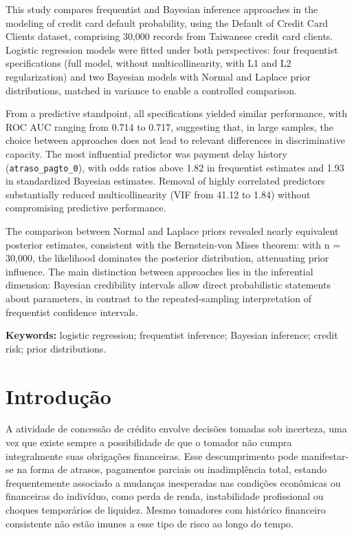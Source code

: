 \documentclass[
  brazilian,
  12pt,
  letterpaper,
  DIV=11,
  numbers=noendperiod]{scrartcl}
\begin{document}
This study compares frequentist and Bayesian inference approaches in the modeling of credit card default probability, using the Default of Credit Card Clients dataset, comprising 30,000 records from Taiwanese credit card clients. Logistic regression models were fitted under both perspectives: four frequentist specifications (full model, without multicollinearity, with L1 and L2 regularization) and two Bayesian models with Normal and Laplace prior distributions, matched in variance to enable a controlled comparison.

From a predictive standpoint, all specifications yielded similar performance, with ROC AUC ranging from 0.714 to 0.717, suggesting that, in large samples, the choice between approaches does not lead to relevant differences in discriminative capacity. The most influential predictor was payment delay history (\texttt{atraso\_pagto\_0}), with odds ratios above 1.82 in frequentist estimates and 1.93 in standardized Bayesian estimates. Removal of highly correlated predictors substantially reduced multicollinearity (VIF from 41.12 to 1.84) without compromising predictive performance.

The comparison between Normal and Laplace priors revealed nearly equivalent posterior estimates, consistent with the Bernstein-von Mises theorem: with n = 30,000, the likelihood dominates the posterior distribution, attenuating prior influence. The main distinction between approaches lies in the inferential dimension: Bayesian credibility intervals allow direct probabilistic statements about parameters, in contrast to the repeated-sampling interpretation of frequentist confidence intervals.


\vspace{1cm}

\noindent\textbf{Keywords:} logistic regression; frequentist inference; Bayesian inference; credit risk; prior distributions.
\newpage

\tableofcontents
\newpage

\section{Introdução}\label{introduuxe7uxe3o}

A atividade de concessão de crédito envolve decisões tomadas sob
incerteza, uma vez que existe sempre a possibilidade de que o tomador
não cumpra integralmente suas obrigações financeiras. Esse
descumprimento pode manifestar-se na forma de atrasos, pagamentos
parciais ou inadimplência total, estando frequentemente associado a
mudanças inesperadas nas condições econômicas ou financeiras do
indivíduo, como perda de renda, instabilidade profissional ou choques
temporários de liquidez. Mesmo tomadores com histórico financeiro
consistente não estão imunes a esse tipo de risco ao longo do tempo.
\end{document}
